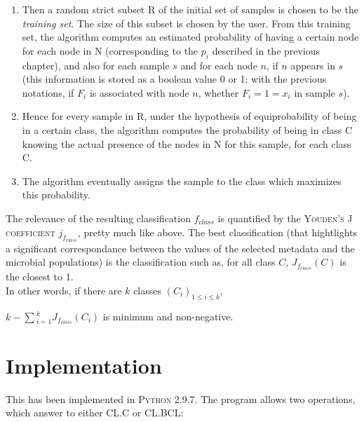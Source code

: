 \documentclass{report}
\begin{document}
\begin{enumerate}
\item Then a random strict subset \textsc{R} of the initial set of samples is chosen to be the \emph{training set}. The size of this subset is chosen by the user. From this training set, the algorithm computes an estimated probability of having a certain node for each node in \textsc{N} (corresponding to the $p_{i}$ described in the previous chapter), and also for each sample $s$ and for each node $n$, if $n$ appears in $s$ (this information is stored as a boolean value 0 or 1: with the previous notations, if $F_{i}$ is associated with node $n$, whether $F_{i} = 1 = x_{i}$ in sample $s$).

\item Hence for every sample in \textsc{R}, under the hypothesis of equiprobability of being in a certain class, the algorithm computes the probability of being in class \textsc{C} knowing the actual presence of the nodes in \textsc{N} for this sample, for each class \textsc{C}. 

\item The algorithm eventually assigns the sample to the class which maximizes this probability.

\end{enumerate}

The relevance of the resulting classification $f_{class}$ is quantified by the \textsc{Youden's J coefficient} $j_{f_{class}}$, pretty much like above. The best classification (that hightlights a significant correspondance between the values of the selected metadata and the microbial populations) is the classification such as, for all class $C$, $J_{f_{class}}(C)$ is the closest to 1.\\

In other words, if there are $k$ classes $(C_{i})_{1 \le i \le k}$,\\

\begin{center}
$k - \sum{_{i = 1}^{k}}{J_{f_{class}}(C_{i})}$ is minimum and non-negative.
\end{center}

\section{Implementation}

This has been implemented in \textsc{Python 2.9.7}. The program allows two operations, which answer to either \textsc{CL.C} or \textsc{CL.BCL}:\\
\end{document}

